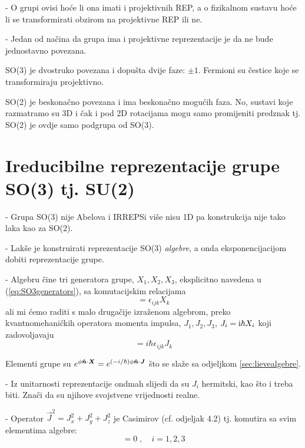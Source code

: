 - O grupi ovisi hoće li ona imati i projektivnih REP, a o fizikalnom
sustavu hoće li se transformirati obzirom na projektivne REP ili ne.

- Jedan od načina da grupa ima i projektivne reprezentacije je da
  ne bude jednostavno povezana.

SO(3) je dvostruko povezana i dopušta dvije faze: $\pm 1$. Fermioni
su čestice koje se transformiraju projektivno.

SO(2) je beskonačno povezana i ima beskonačno mogućih faza. No, sustavi
koje razmatramo su 3D i čak i pod 2D rotacijama mogu samo promijeniti
predznak tj. SO(2) je ovdje samo podgrupa od SO(3).

\section{Ireducibilne reprezentacije grupe SO(3) tj. SU(2)}

- Grupa SO(3) nije Abelova i IRREPSi više nisu 1D pa konstrukcija nije
tako laka kao za SO(2).

- Lakše je konstruirati reprezentacije SO(3) \emph{algebre}, a onda
  eksponencijacijom dobiti reprezentacije grupe.

- Algebru čine tri generatora grupe, $X_1, X_2, X_3$, eksplicitno navedena u
(\ref{eq:SO3generators}), sa komutacijskim relacijama
\begin{equation}
          [X_i, X_j] = \epsilon_{ijk} X_k
\end{equation}
ali mi ćemo raditi s malo drugačije izraženom algebrom, preko kvantnomehaničkih operatora
momenta impulsa, $J_1, J_2, J_3$, $J_i=\textrm{i} \hbar X_i$ koji zadovoljavaju
\begin{equation}
          [J_i, J_j] = i \hbar \epsilon_{ijk} J_k
\label{eq:SU2algebra}
\end{equation}
 
Elementi grupe su $e^{\phi\unitn\cdot\vec{X}}=e^{(-i/\hbar)\phi\unitn\cdot
 \vec{J}}$ što se slaže sa odjeljkom \ref{sec:lievealgebre}.

- Iz unitarnosti reprezentacije ondmah slijedi da su $J_i$ hermitski, kao
  što i treba biti. Znači da su njihove svojstvene vrijednosti realne.

- Operator $\vec{J}^2 = J_{x}^2 + J_{y}^2 + J_{z}^2$ je Casimirov
  (cf. odjeljak 4.2) tj. komutira sa svim elementima algebre:
\begin{equation}
   [\jsq, J_{i}^2]=0\;, \quad i=1,2,3
\end{equation}

